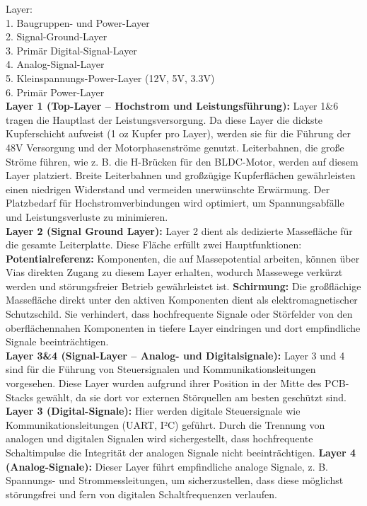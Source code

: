 \documentclass[paper=a4,11pt]{scrreprt}
\begin{document}
Layer:\\
1. Baugruppen- und Power-Layer\\
2. Signal-Ground-Layer\\
3. Primär Digital-Signal-Layer\\
4. Analog-Signal-Layer\\
5. Kleinspannungs-Power-Layer (12V, 5V, 3.3V)\\
6. Primär Power-Layer\\
\textbf{Layer 1 (Top-Layer – Hochstrom und Leistungsführung):} Layer 1\&6 tragen die Hauptlast der Leistungsversorgung. Da diese Layer die dickste Kupferschicht aufweist (1 oz Kupfer pro Layer), werden sie für die Führung der 48V Versorgung und der Motorphasenströme genutzt. Leiterbahnen, die große Ströme führen, wie z. B. die H-Brücken für den BLDC-Motor, werden auf diesem Layer platziert. Breite Leiterbahnen und großzügige Kupferflächen gewährleisten einen niedrigen Widerstand und vermeiden unerwünschte Erwärmung. Der Platzbedarf für Hochstromverbindungen wird optimiert, um Spannungsabfälle und Leistungsverluste zu minimieren.\\
\textbf{Layer 2 (Signal Ground Layer):} Layer 2 dient als dedizierte Massefläche für die gesamte Leiterplatte. Diese Fläche erfüllt zwei Hauptfunktionen:
\textbf{Potentialreferenz:} Komponenten, die auf Massepotential arbeiten, können über Vias direkten Zugang zu diesem Layer erhalten, wodurch Massewege verkürzt werden und störungsfreier Betrieb gewährleistet ist.
\textbf{Schirmung:} Die großflächige Massefläche direkt unter den aktiven Komponenten dient als elektromagnetischer Schutzschild. Sie verhindert, dass hochfrequente Signale oder Störfelder von den oberflächennahen Komponenten in tiefere Layer eindringen und dort empfindliche Signale beeinträchtigen.\\
\textbf{Layer 3\&4 (Signal-Layer – Analog- und Digitalsignale):} Layer 3 und 4 sind für die Führung von Steuersignalen und Kommunikationsleitungen vorgesehen. Diese Layer wurden aufgrund ihrer Position in der Mitte des PCB-Stacks gewählt, da sie dort vor externen Störquellen am besten geschützt sind. \textbf{Layer 3 (Digital-Signale):} Hier werden digitale Steuersignale wie Kommunikationsleitungen (UART, I²C) geführt. Durch die Trennung von analogen und digitalen Signalen wird sichergestellt, dass hochfrequente Schaltimpulse die Integrität der analogen Signale nicht beeinträchtigen.
\textbf{Layer 4 (Analog-Signale):} Dieser Layer führt empfindliche analoge Signale, z. B. Spannungs- und Strommessleitungen, um sicherzustellen, dass diese möglichst störungsfrei und fern von digitalen Schaltfrequenzen verlaufen.\\
\end{document}
